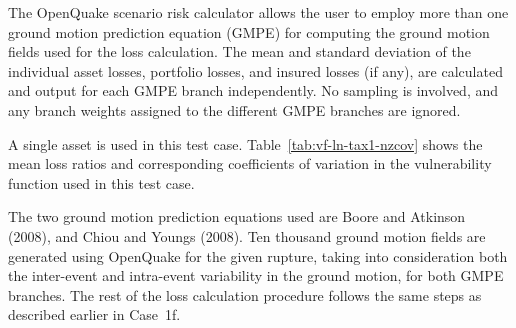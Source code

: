 The OpenQuake scenario risk calculator allows the user to employ more than one ground motion prediction equation (GMPE) for computing the ground motion fields used for the loss calculation. The mean and standard deviation of the individual asset losses, portfolio losses, and insured losses (if any), are calculated and output for each GMPE branch independently. No sampling is involved, and any branch weights assigned to the different GMPE branches are ignored.

A single asset is used in this test case. Table~\ref{tab:vf-ln-tax1-nzcov} shows the mean loss ratios and corresponding coefficients of variation in the vulnerability function used in this test case.

The two ground motion prediction equations used are Boore and Atkinson (2008), and Chiou and Youngs (2008). Ten thousand ground motion fields are generated using OpenQuake for the given rupture, taking into consideration both the inter-event and intra-event variability in the ground motion, for both GMPE branches. The rest of the loss calculation procedure follows the same steps as described earlier in Case~1f.